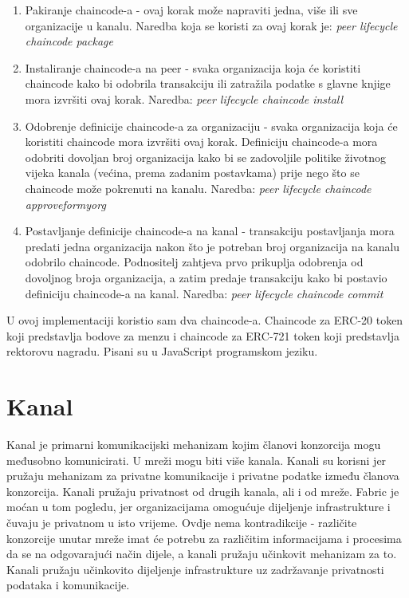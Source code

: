 \documentclass[times, utf8, diplomski]{fer}
\begin{document}
\begin{enumerate}
\item Pakiranje chaincode-a - ovaj korak može napraviti jedna,  više ili sve organizacije u kanalu.  Naredba koja se koristi za ovaj korak je: 
\textit{peer lifecycle chaincode package}

\item Instaliranje chaincode-a na peer - svaka organizacija koja će koristiti chaincode kako bi odobrila transakciju ili zatražila podatke s glavne knjige mora izvršiti ovaj korak.  Naredba:
\textit{peer lifecycle chaincode install}

\item Odobrenje definicije chaincode-a za organizaciju - svaka organizacija koja će koristiti chaincode mora izvršiti ovaj korak.  Definiciju chaincode-a mora odobriti dovoljan broj organizacija kako bi se zadovoljile politike životnog vijeka kanala (većina,  prema zadanim postavkama) prije nego što se chaincode može pokrenuti na kanalu.  Naredba:
\textit{peer lifecycle chaincode approveformyorg}

\item  Postavljanje definicije chaincode-a na kanal - transakciju postavljanja mora predati jedna organizacija nakon što je potreban broj organizacija na kanalu odobrilo chaincode. Podnositelj zahtjeva prvo prikuplja odobrenja od dovoljnog broja organizacija,  a zatim predaje transakciju kako bi postavio definiciju chaincode-a na kanal. Naredba:
\textit{peer lifecycle chaincode commit}
\end{enumerate}

U ovoj implementaciji koristio sam dva chaincode-a. Chaincode za ERC-20 token koji predstavlja bodove za menzu i chaincode za ERC-721 token koji predstavlja rektorovu nagradu. Pisani su u JavaScript programskom jeziku.

\section{Kanal}

Kanal je primarni komunikacijski mehanizam kojim članovi konzorcija mogu međusobno komunicirati. U mreži mogu biti više kanala. Kanali su korisni jer pružaju mehanizam za privatne komunikacije i privatne podatke između članova konzorcija. Kanali pružaju privatnost od drugih kanala, ali i od mreže. Fabric je moćan u tom pogledu, jer organizacijama omogućuje dijeljenje infrastrukture i čuvaju je privatnom u isto vrijeme. Ovdje nema kontradikcije - različite konzorcije unutar mreže imat će potrebu za različitim informacijama i procesima da se na odgovarajući način dijele, a kanali pružaju učinkovit mehanizam za to. Kanali pružaju učinkovito dijeljenje infrastrukture uz zadržavanje privatnosti podataka i komunikacije.
\end{document}
